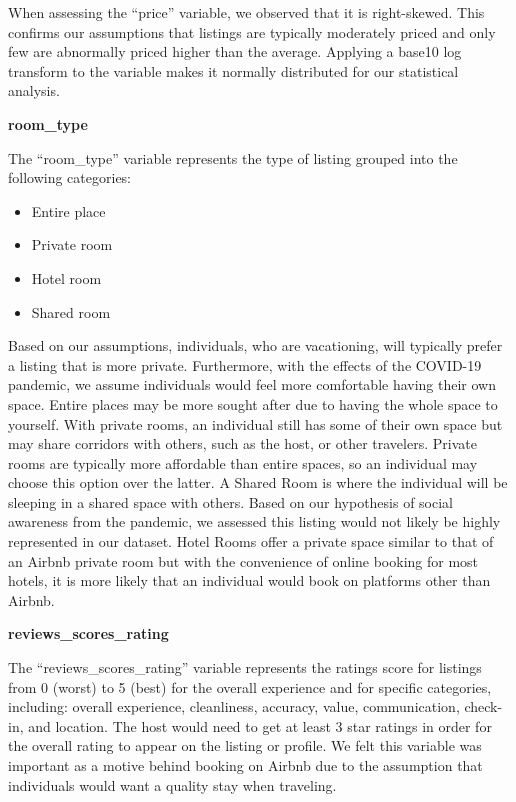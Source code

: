 \documentclass[
]{article}
\begin{document}
When assessing the ``price'' variable, we observed that it is right-skewed. This confirms our assumptions that listings are typically moderately priced and only few are abnormally priced higher than the average. Applying a base10 log transform to the variable makes it normally distributed for our statistical analysis.

\textbf{room\_type}

The ``room\_type'' variable represents the type of listing grouped into the following categories:

\begin{itemize}
\item
  Entire place
\item
  Private room
\item
  Hotel room
\item
  Shared room
\end{itemize}

Based on our assumptions, individuals, who are vacationing, will typically prefer a listing that is more private. Furthermore, with the effects of the COVID-19 pandemic, we assume individuals would feel more comfortable having their own space. Entire places may be more sought after due to having the whole space to yourself. With private rooms, an individual still has some of their own space but may share corridors with others, such as the host, or other travelers. Private rooms are typically more affordable than entire spaces, so an individual may choose this option over the latter. A Shared Room is where the individual will be sleeping in a shared space with others. Based on our hypothesis of social awareness from the pandemic, we assessed this listing would not likely be highly represented in our dataset. Hotel Rooms offer a private space similar to that of an Airbnb private room but with the convenience of online booking for most hotels, it is more likely that an individual would book on platforms other than Airbnb.

\textbf{reviews\_scores\_rating}

The ``reviews\_scores\_rating'' variable represents the ratings score for listings from 0 (worst) to 5 (best) for the overall experience and for specific categories, including: overall experience, cleanliness, accuracy, value, communication, check-in, and location. The host would need to get at least 3 star ratings in order for the overall rating to appear on the listing or profile. We felt this variable was important as a motive behind booking on Airbnb due to the assumption that individuals would want a quality stay when traveling.
\end{document}
